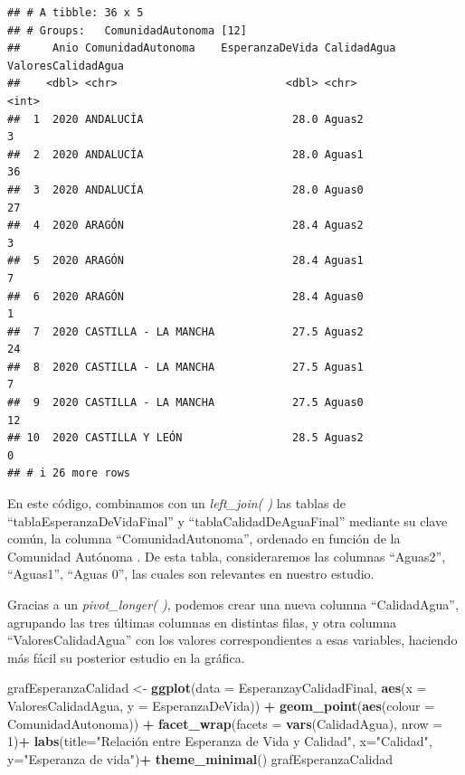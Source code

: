 \documentclass[
]{article}
\newenvironment{Shaded}{\begin{snugshade}}{\end{snugshade}}
\newcommand{\AttributeTok}[1]{\textcolor[rgb]{0.13,0.29,0.53}{#1}}
\newcommand{\DecValTok}[1]{\textcolor[rgb]{0.00,0.00,0.81}{#1}}
\newcommand{\FunctionTok}[1]{\textcolor[rgb]{0.13,0.29,0.53}{\textbf{#1}}}
\newcommand{\NormalTok}[1]{#1}
\newcommand{\OtherTok}[1]{\textcolor[rgb]{0.56,0.35,0.01}{#1}}
\newcommand{\SpecialCharTok}[1]{\textcolor[rgb]{0.81,0.36,0.00}{\textbf{#1}}}
\newcommand{\StringTok}[1]{\textcolor[rgb]{0.31,0.60,0.02}{#1}}
\begin{document}
\begin{verbatim}
## # A tibble: 36 x 5
## # Groups:   ComunidadAutonoma [12]
##     Anio ComunidadAutonoma    EsperanzaDeVida CalidadAgua ValoresCalidadAgua
##    <dbl> <chr>                          <dbl> <chr>                    <int>
##  1  2020 ANDALUCÍA                       28.0 Aguas2                       3
##  2  2020 ANDALUCÍA                       28.0 Aguas1                      36
##  3  2020 ANDALUCÍA                       28.0 Aguas0                      27
##  4  2020 ARAGÓN                          28.4 Aguas2                       3
##  5  2020 ARAGÓN                          28.4 Aguas1                       7
##  6  2020 ARAGÓN                          28.4 Aguas0                       1
##  7  2020 CASTILLA - LA MANCHA            27.5 Aguas2                      24
##  8  2020 CASTILLA - LA MANCHA            27.5 Aguas1                       7
##  9  2020 CASTILLA - LA MANCHA            27.5 Aguas0                      12
## 10  2020 CASTILLA Y LEÓN                 28.5 Aguas2                       0
## # i 26 more rows
\end{verbatim}

En este código, combinamos con un \emph{left\_join( )} las tablas de
``tablaEsperanzaDeVidaFinal'' y ``tablaCalidadDeAguaFinal'' mediante su
clave común, la columna ``ComunidadAutonoma'', ordenado en función de la
Comunidad Autónoma . De esta tabla, consideraremos las columnas
``Aguas2'', ``Aguas1'', ``Aguas 0'', las cuales son relevantes en
nuestro estudio.

Gracias a un \emph{pivot\_longer( ),} podemos crear una nueva columna
``CalidadAgua'', agrupando las tres últimas columnas en distintas filas,
y otra columna ``ValoresCalidadAgua'' con los valores correspondientes a
esas variables, haciendo más fácil su posterior estudio en la gráfica.

\begin{Shaded}
\begin{Highlighting}[]
\NormalTok{grafEsperanzaCalidad }\OtherTok{\textless{}{-}} \FunctionTok{ggplot}\NormalTok{(}\AttributeTok{data =}\NormalTok{ EsperanzayCalidadFinal, }\FunctionTok{aes}\NormalTok{(}\AttributeTok{x =}\NormalTok{ ValoresCalidadAgua, }\AttributeTok{y =}\NormalTok{ EsperanzaDeVida)) }\SpecialCharTok{+}
  \FunctionTok{geom\_point}\NormalTok{(}\FunctionTok{aes}\NormalTok{(}\AttributeTok{colour =}\NormalTok{ ComunidadAutonoma)) }\SpecialCharTok{+}
  \FunctionTok{facet\_wrap}\NormalTok{(}\AttributeTok{facets =} \FunctionTok{vars}\NormalTok{(CalidadAgua), }\AttributeTok{nrow =} \DecValTok{1}\NormalTok{)}\SpecialCharTok{+}
  \FunctionTok{labs}\NormalTok{(}\AttributeTok{title=}\StringTok{"Relación entre Esperanza de Vida y Calidad"}\NormalTok{,}
       \AttributeTok{x=}\StringTok{"Calidad"}\NormalTok{,}
       \AttributeTok{y=}\StringTok{"Esperanza de vida"}\NormalTok{)}\SpecialCharTok{+}
  \FunctionTok{theme\_minimal}\NormalTok{()}
\NormalTok{grafEsperanzaCalidad}
\end{Highlighting}
\end{Shaded}
\end{document}
